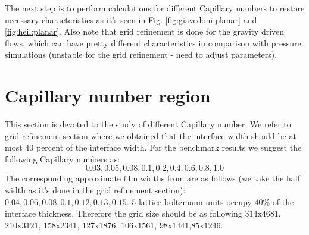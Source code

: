 \documentclass{article}
\begin{document}
{\color{red} The next step is to perform calculations for different Capillary
numbers to restore necessary characteristics as it's seen in Fig.
\ref{fig:giavedoni:planar} and \ref{fig:heil:planar}. Also note that grid
refinement is done for the gravity driven flows, which can have pretty
different characteristics in comparison with pressure simulations (unstable
for the grid refinement - need to adjust parameters)}.

\section{Capillary number region}
This section is devoted to the study of different Capillary number. We refer to
grid refinement section where we obtained that the interface width should be
at most $40$ percent of the interface width. For the benchmark results we
suggest the following Capillary numbers as:
\begin{equation}
0.03,0.05,0.08,0.1,0.2,0.4,0.6,0.8,1.0
\end{equation}
The corresponding approximate film widths from \cite{giavedoni-numerical} are as
follows (we take the half width as it's done in the grid refinement section):
$0.04,0.06,0.08,0.1,0.12,0.13,0.15$. $5$ lattice boltzmann units occupy
$40\%$ of the interface thickness. Therefore the grid size should be as
following $314\mathrm{x}4681$,$210\mathrm{x}3121$,
$158\mathrm{x}2341$, $127\mathrm{x}1876$, $106\mathrm{x}1561$,
$98\mathrm{x}1441$,$85\mathrm{x}1246$. 
\end{document}
